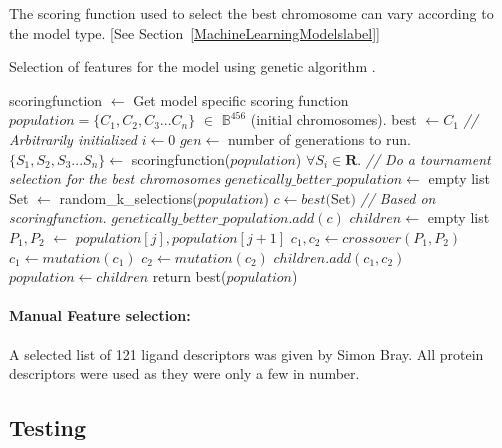 \documentclass[11pt]{article}
\begin{document}
The scoring function used to select the best chromosome can vary according to the model type. [See Section~\ref{MachineLearningModelslabel}]

\begin{algorithm}
\caption{Selection of features for the model using genetic algorithm \cite{genetic_algorithm}.}
\label{alg:GeneticAlgo}
\begin{algorithmic}[1]
\State scoringfunction $\gets$ Get model specific scoring function
\State $ population = \{C_1, C_2, C_3... C_n\}$ $\in$ $\mathbb{B}^{456}$ (initial chromosomes).
\State best $\gets C_1$  \textit{// Arbitrarily initialized}
\State $i \gets 0$
\State $gen \gets$ number of generations to run.
          \State $\{S_1, S_2, S_3... S_n\} \gets$ scoringfunction($population$) $\forall S_i \in \mathbf{R}$.
          \State \textit{// Do a tournament selection for the best chromosomes}
          \State $genetically\_better\_population \gets$ empty list
              \State Set $\gets$ random\_k\_selections($population$)
              \State $c \gets best($Set$)$ \textit{// Based on scoringfunction.}
              \State $genetically\_better\_population.add(c)$
          \EndFor
          \State $children \gets$ empty list
              \State $P_1, P_2$ $\gets$ $population[j], population[j+1]$
              \State $c_1, c_2 \gets crossover(P_1, P_2)$
              \State $c_1 \gets mutation(c_1)$
              \State $c_2 \gets mutation(c_2)$
              \State $children.add(c_1, c_2)$
          \EndFor
          \State $population \gets children$
      \EndFor
\State return best($population$)
\EndProcedure
\end{algorithmic}
\end{algorithm}

\paragraph{Manual Feature selection:}
A selected list of 121 ligand descriptors was given by Simon Bray. 
All protein descriptors were used as they were only a few in number.

\subsection{Testing}
\end{document}
